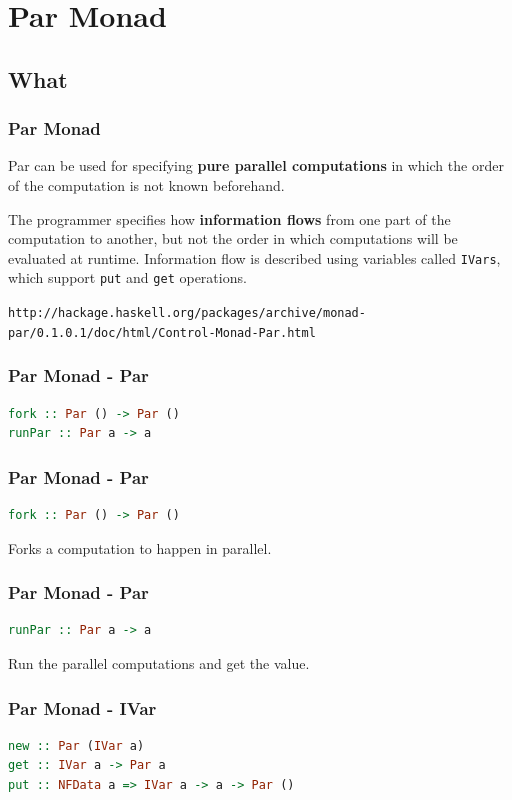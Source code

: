 \documentclass[12pt, danish]{beamer}
\begin{document}
\section{Par Monad}

\subsection{What}

\begin{frame}
  \frametitle{Par Monad}
  Par can be used for specifying \textbf{pure parallel computations} in which the order of the computation is not known beforehand. \newline
  
  The programmer specifies how \textbf{information flows} from one part of the computation to another, but not the order in which computations will be evaluated at runtime. Information flow is described using variables called \texttt{IVars}, which support \texttt{put} and \texttt{get} operations. \newline 
  
  \tiny{\texttt{http://hackage.haskell.org/packages/archive/monad-par/0.1.0.1/doc/html/Control-Monad-Par.html}}
\end{frame}

\begin{frame}[fragile]
  \frametitle{Par Monad - Par}
  \begin{lstlisting}[language=Haskell]
fork :: Par () -> Par ()
runPar :: Par a -> a
  \end{lstlisting}
\end{frame}

\begin{frame}[fragile]
  \frametitle{Par Monad - Par}
  \begin{lstlisting}[language=Haskell]
fork :: Par () -> Par ()
  \end{lstlisting}

  Forks a computation to happen in parallel.
\end{frame}

\begin{frame}[fragile]
  \frametitle{Par Monad - Par}
  \begin{lstlisting}[language=Haskell]
runPar :: Par a -> a
  \end{lstlisting}

  Run the parallel computations and get the value.
\end{frame}

\begin{frame}[fragile]
  \frametitle{Par Monad - IVar}
  \begin{lstlisting}[language=Haskell]
new :: Par (IVar a)
get :: IVar a -> Par a
put :: NFData a => IVar a -> a -> Par ()
  \end{lstlisting}
\end{frame}
\end{document}
